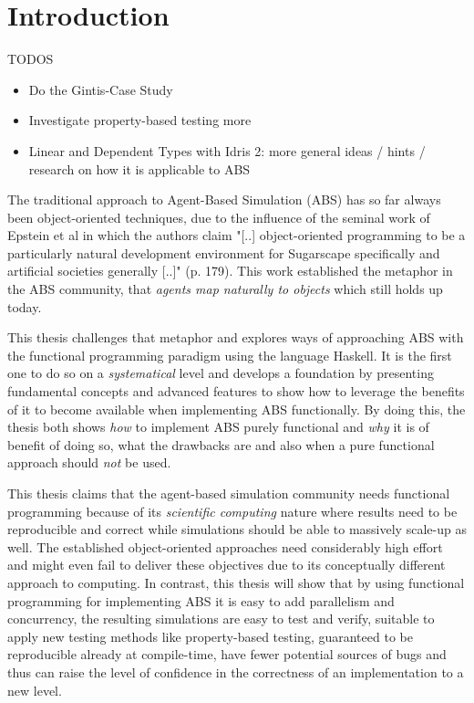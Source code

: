\chapter{Introduction}
TODOS
\begin{itemize}
	\item Do the Gintis-Case Study
	\item Investigate property-based testing more
	\item Linear and Dependent Types with Idris 2: more general ideas / hints / research on how it is applicable to ABS
\end{itemize}

The traditional approach to Agent-Based Simulation (ABS) has so far always been object-oriented techniques, due to the influence of the seminal work of Epstein et al \cite{epstein_growing_1996} in which the authors claim "[..] object-oriented programming to be a particularly natural development environment for Sugarscape specifically and artificial societies generally [..]" (p. 179). This work established the metaphor in the ABS community, that \textit{agents map naturally to objects} \cite{north_managing_2007} which still holds up today.

This thesis challenges that metaphor and explores ways of approaching ABS with the functional programming paradigm using the language Haskell. It is the first one to do so on a \textit{systematical} level and develops a foundation by presenting fundamental concepts and advanced features to show how to leverage the benefits of it \cite{hudak_haskell_1994, hudak_history_2007} to become available when implementing ABS functionally. By doing this, the thesis both shows \textit{how} to implement ABS purely functional and \textit{why} it is of benefit of doing so, what the drawbacks are and also when a pure functional approach should \textit{not} be used. 

This thesis claims that the agent-based simulation community needs functional programming because of its \textit{scientific computing} nature where results need to be reproducible and correct while simulations should be able to massively scale-up as well. The established object-oriented approaches need considerably high effort and might even fail to deliver these objectives due to its conceptually different approach to computing. In contrast, this thesis will show that by using functional programming for implementing ABS it is easy to add parallelism and concurrency, the resulting simulations are easy to test and verify, suitable to apply new testing methods like property-based testing, guaranteed to be reproducible already at compile-time, have fewer potential sources of bugs and thus can raise the level of confidence in the correctness of an implementation to a new level.


